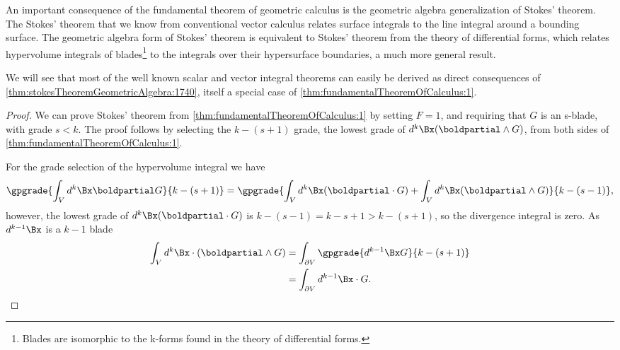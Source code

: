 %
%
An important consequence of the fundamental theorem of geometric calculus is the
geometric algebra generalization of Stokes' theorem.
The Stokes' theorem that we know from conventional vector calculus relates
 surface integrals to the line integral around a bounding surface.
The geometric algebra form of Stokes' theorem is equivalent to Stokes' theorem from the theory of differential forms, which relates
hypervolume integrals of blades\footnote{Blades are isomorphic to the k-forms found in the theory of differential forms.} to the integrals over their hypersurface boundaries, a much more general result.



We will see that most of the well known scalar and vector integral theorems can easily be derived as direct consequences of \cref{thm:stokesTheoremGeometricAlgebra:1740}, itself a special case of \cref{thm:fundamentalTheoremOfCalculus:1}.

\begin{proof}
We can prove Stokes' theorem
from \cref{thm:fundamentalTheoremOfCalculus:1}
by setting \( F = 1 \), and requiring that \( G \)
is an s-blade, with grade \( s < k \).
The proof follows by selecting the \( k-(s+1) \) grade, the lowest grade of \( d^k \Bx (\boldpartial \wedge G) \), from both sides of \cref{thm:fundamentalTheoremOfCalculus:1}.

For the grade selection of the hypervolume integral we have
\begin{equation}\label{eqn:stokesTheoremTheStatement:100}
\gpgrade{ \int_V d^k \Bx \boldpartial G }{k-(s+1)}
=
\gpgrade{
\int_V d^k \Bx (\boldpartial \cdot G )
+
\int_V d^k \Bx (\boldpartial \wedge G )
}{k-(s-1)},
\end{equation}
however, the lowest grade of \( d^k \Bx (\boldpartial \cdot G ) \) is \( k -(s-1) = k - s + 1 > k - (s+1) \), so the divergence integral is zero.  As \( d^{k-1} \Bx \) is a \( k - 1 \) blade
\begin{equation}\label{eqn:stokesTheoremTheStatement:110}
\begin{aligned}
\int_V d^k \Bx \cdot (\boldpartial \wedge G )
&= \int_{\partial V} \gpgrade{d^{k-1} \Bx G}{k-(s+1)} \\
&= \int_{\partial V} d^{k-1} \Bx \cdot G.
\end{aligned}
\end{equation}
\end{proof}
